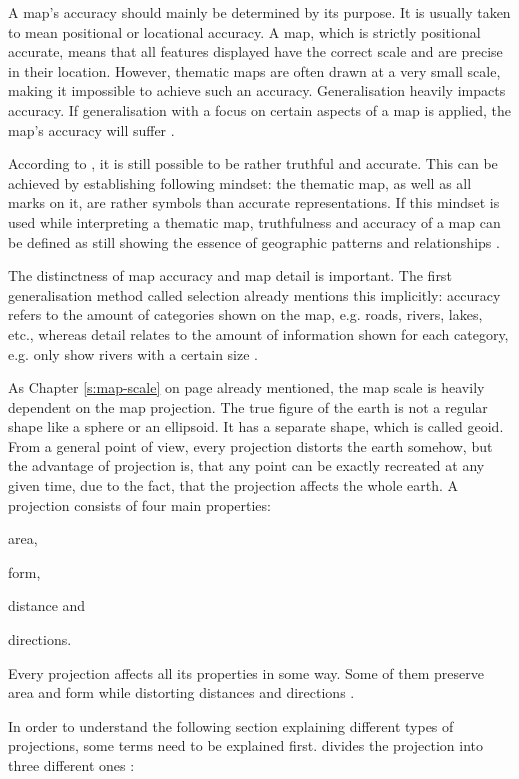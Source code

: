 A map's accuracy should mainly be determined by its purpose. It is usually taken to mean positional or locational accuracy. A map, which is strictly positional accurate, means that all features displayed have the correct scale and are precise in their location. However, thematic maps are often drawn at a very small scale, making it impossible to achieve such an accuracy. Generalisation heavily impacts accuracy. If generalisation with a focus on certain aspects of a map is applied, the map's accuracy will suffer .

According to \citeauthor{Tyner2010}, it is still possible to be rather truthful and accurate. This can be achieved by establishing following mindset: the thematic map, as well as all marks on it, are rather symbols than accurate representations. If this mindset is used while interpreting a thematic map, truthfulness and accuracy of a map can be defined as still showing the essence of geographic patterns and relationships .

The distinctness of map accuracy and map detail is important. The first generalisation method called selection already mentions this implicitly: accuracy refers to the amount of categories shown on the map, e.g. roads, rivers, lakes, etc., whereas detail relates to the amount of information shown for each category, e.g. only show rivers with a certain size .

As Chapter \ref{s:map-scale} on page \pageref{s:map-scale} already mentioned, the map scale is heavily dependent on the map projection. The true figure of the earth is not a regular shape like a sphere or an ellipsoid. It has a separate shape, which is called geoid.
From a general point of view, every projection distorts the earth somehow, but the advantage of projection is, that any point can be exactly recreated at any given time, due to the fact, that the projection affects the whole earth.
A projection consists of four main properties:
\begin{enumerate*}[label={(\arabic*)}]
\item area,
\item form,
\item distance and
\item directions.
\end{enumerate*}
Every projection affects all its properties in some way. Some of them preserve area and form while distorting distances and directions .

In order to understand the following section explaining different types of projections, some terms need to be explained first. \citeauthor{Snyder1987} divides the projection into three different ones :

